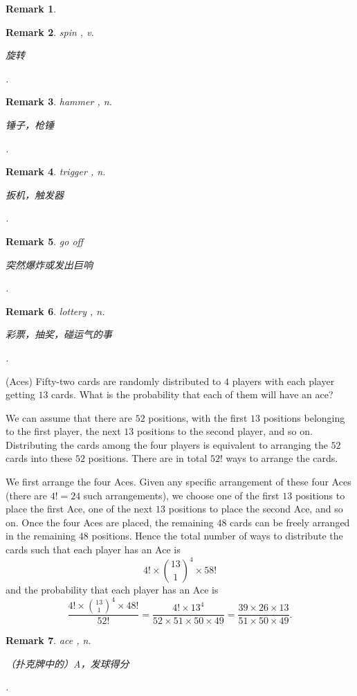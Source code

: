 \documentclass[12pt,letterpaper, onecolumn]{exam}
\newtheorem{remark}{Remark}
\begin{document}
\begin{questions}
\begin{remark}
\end{remark}
\begin{remark}
    spin , v. \begin{CJK}{UTF8}{gbsn}旋转\end{CJK}.
\end{remark}
\begin{remark}
    hammer , n. \begin{CJK}{UTF8}{gbsn}锤子，枪锤\end{CJK}.
\end{remark}
\begin{remark}
    trigger , n. \begin{CJK}{UTF8}{gbsn}扳机，触发器\end{CJK}.
\end{remark}
\begin{remark}
    go off \begin{CJK}{UTF8}{gbsn}突然爆炸或发出巨响\end{CJK}.
\end{remark}
\begin{remark}
    lottery , n. \begin{CJK}{UTF8}{gbsn}彩票，抽奖，碰运气的事\end{CJK}.
\end{remark}

\question[](Aces) Fifty-two cards are randomly distributed to $4$ players with each player getting $13$ cards. What is the probability that each of them will have an ace?
\begin{solution}
    We can assume that there are $52$ positions, with the first $13$ positions belonging to the first player, the next $13$ positions to the second player, and so on. Distributing the cards among the four players is equivalent to arranging the $52$ cards into these $52$ positions. There are in total $52!$ ways to arrange the cards.

    \quad We first arrange the four Aces. Given any specific arrangement of these four Aces (there are $4!=24$ such arrangements), we choose one of the first $13$ positions to place the first Ace, one of the next $13$ positions to place the second Ace, and so on. Once the four Aces are placed, the remaining $48$ cards can be freely arranged in the remaining $48$ positions. Hence the total number of ways to distribute the cards such that each player has an Ace is 
    $$4!\times\binom{13}{1}^4\times 58!$$
    and the probability that each player has an Ace is
    $$\frac{4!\times\binom{13}{1}^4\times 48!}{52!}=\frac{4!\times 13^4}{52\times 51\times 50\times 49}=\frac{39\times 26\times 13}{51\times 50\times 49}.$$
\end{solution}
\begin{remark}
    ace , n. \begin{CJK}{UTF8}{gbsn}（扑克牌中的）A，发球得分\end{CJK}.
\end{remark}


\end{questions}
\end{document}
